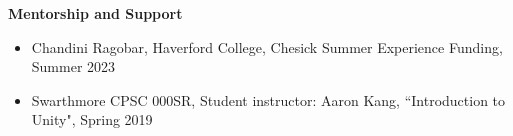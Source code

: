 {\bf Mentorship and Support} 
\vspace{-1.0em}

\begin{itemize}[leftmargin=*,label={}]
\item Chandini Ragobar, Haverford College, Chesick Summer Experience Funding, Summer 2023
\item Swarthmore CPSC 000SR, Student instructor: Aaron Kang, ``Introduction to Unity", Spring 2019
\end{itemize}


